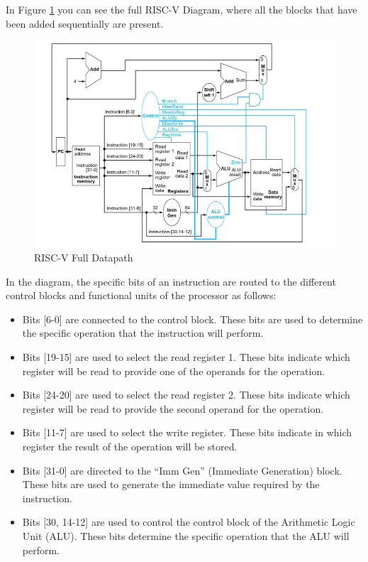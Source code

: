             In Figure \ref{risc_4} you can see the full RISC-V Diagram, where all the blocks that have been added sequentially are present. 
            
                    \begin{figure}[!h]
            	    \centering
            	    \includegraphics[width= 1
            	    \textwidth]{figures/riscv/risc_4.jpg}
                        \caption{\label{risc_4} RISC-V Full Datapath}
                    \end{figure}
            In the diagram, the specific bits of an instruction are routed to the different control blocks and functional units of the processor as follows:
    
            \begin{itemize}
            \item Bits [6-0] are connected to the control block. These bits are used to determine the specific operation that the instruction will perform.
            \item Bits [19-15] are used to select the read register 1. These bits indicate which register will be read to provide one of the operands for the operation.
    
            \item Bits [24-20] are used to select the read register 2. These bits indicate which register will be read to provide the second operand for the operation.
    
            \item Bits [11-7] are used to select the write register. These bits indicate in which register the result of the operation will be stored.
    
            \item Bits [31-0] are directed to the ``Imm Gen'' (Immediate Generation) block. These bits are used to generate the immediate value required by the instruction.
    
            \item Bits [30, 14-12] are used to control the control block of the Arithmetic Logic Unit (ALU). These bits determine the specific operation that the ALU will perform.
            \end{itemize}
        

